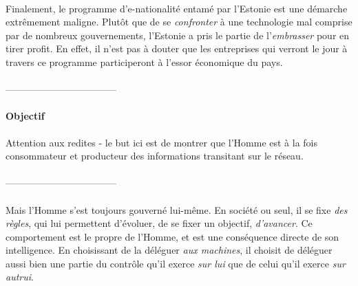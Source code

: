 \paragraph{} Finalement, le programme d'e-nationalité entamé par l'Estonie est une démarche extrêmement maligne. Plutôt
que de se \emph{confronter} à une technologie mal comprise par de nombreux gouvernements, l'Estonie a pris le partie de
l'\emph{embrasser} pour en tirer profit. En effet, il n'est pas à douter que les entreprises qui verront le jour à travers
ce programme participeront à l'essor économique du pays.


\paragraph{} -----------------------------------

\paragraph{Objectif} Attention aux redites - le but ici est de montrer que l'Homme est à la fois
consommateur et producteur des informations transitant sur le réseau.

\paragraph{} -----------------------------------

\paragraph{} Mais l'Homme s'est toujours gouverné lui-même. En société ou seul, il se fixe
\emph{des règles}, qui lui permettent d'évoluer, de se fixer un objectif, \emph{d'avancer}.
Ce comportement est le propre de l'Homme, et est une conséquence directe de son intelligence.
En choisissant de la déléguer \emph{aux machines}, il choisit de déléguer aussi
bien une partie du contrôle qu'il exerce \emph{sur lui} que de celui qu'il exerce \emph{sur autrui}.